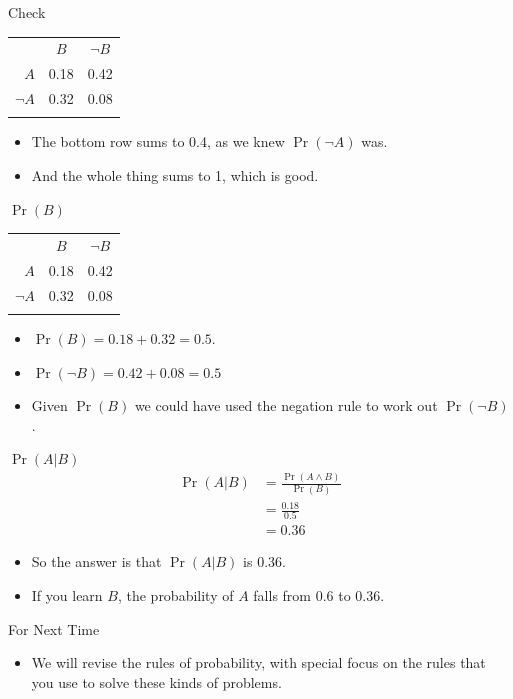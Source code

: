 \documentclass[
  ignorenonframetext,
]{beamer}
\providecommand{\tightlist}{%
  \setlength{\itemsep}{0pt}\setlength{\parskip}{0pt}}
\renewcommand{\,}{\text{, }}
\begin{document}
\begin{frame}{Check}
\protect\hypertarget{check-1}{}
\begin{longtable}[]{@{}rcc@{}}
\toprule
& \(B\) & \(\neg B\) \\ \addlinespace
\midrule
\endhead
\(A\) & 0.18 & 0.42 \\ \addlinespace
\(\neg A\) & 0.32 & 0.08 \\ \addlinespace
\bottomrule
\end{longtable}

\begin{itemize}
\tightlist
\item
  The bottom row sums to 0.4, as we knew \(\Pr(\neg A)\) was.
\item
  And the whole thing sums to 1, which is good.
\end{itemize}
\end{frame}

\begin{frame}{\(\Pr(B)\)}
\protect\hypertarget{prb}{}
\begin{longtable}[]{@{}rcc@{}}
\toprule
& \(B\) & \(\neg B\) \\ \addlinespace
\midrule
\endhead
\(A\) & 0.18 & 0.42 \\ \addlinespace
\(\neg A\) & 0.32 & 0.08 \\ \addlinespace
\bottomrule
\end{longtable}

\begin{itemize}
\tightlist
\item
  \(\Pr(B) = 0.18 + 0.32 = 0.5\). \pause
\item
  \(\Pr(\neg B) = 0.42 + 0.08 = 0.5\) \pause
\item
  Given \(\Pr(B)\) we could have used the negation rule to work out
  \(\Pr(\neg B)\).
\end{itemize}
\end{frame}

\begin{frame}{\(\Pr(A | B)\)}
\protect\hypertarget{pra-b}{}
\begin{align*}
\Pr(A | B) &= \frac{\Pr(A \wedge B)}{\Pr(B)} \\
 &= \frac{0.18}{0.5} \\
 &= 0.36
\end{align*}

\begin{itemize}
\tightlist
\item
  So the answer is that \(\Pr(A | B)\) is 0.36.
\item
  If you learn \(B\), the probability of \(A\) falls from 0.6 to 0.36.
\end{itemize}
\end{frame}

\begin{frame}{For Next Time}
\protect\hypertarget{for-next-time}{}
\begin{itemize}
\tightlist
\item
  We will revise the rules of probability, with special focus on the
  rules that you use to solve these kinds of problems.
\end{itemize}
\end{frame}
\end{document}
